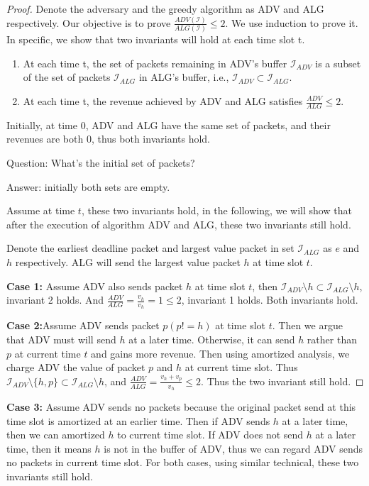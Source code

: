 \documentclass[10 pt,final]{article}
\newcommand{\answer}[1]{{\color{magenta} #1}}
\newcommand{\question}[1]{{\color{blue} #1}}
\begin{document}
\begin{proof} Denote the adversary and the greedy algorithm as ADV and ALG respectively. Our objective is to prove $\frac{ADV(\mathcal{I})}{ALG(\mathcal{I})} \leq 2$. We use induction to prove it. In specific, we show that two invariants will hold at each time slot t.
\begin{enumerate}
\item At each time t, the set of packets remaining in ADV's buffer $\mathcal{I}_{ADV}$ is a subset of the set of packets $\mathcal{I}_{ALG}$ in ALG's buffer, i.e., $\mathcal{I}_{ADV} \subset \mathcal{I}_{ALG}$.
\item At each time t, the revenue achieved by ADV and ALG satisfies $\frac{ADV}{ALG} \leq 2$.
\end{enumerate}



Initially, at time $0$, ADV and ALG have the same set of packets, and their revenues are both $0$, thus both invariants hold. 

\question{ Question: What's the initial set of packets? }

\answer{Answer: initially both sets are empty.}

Assume at time $t$, these two invariants hold, in the following, we will show that after the execution of algorithm ADV and ALG, these two invariants still hold. 

Denote the earliest deadline packet and largest value packet in set $\mathcal{I}_{ALG}$ as $e$ and $h$ respectively. ALG will send the largest value packet $h$ at time slot $t$.

\textbf{Case 1:} Assume ADV also sends packet $h$ at time slot $t$, then $\mathcal{I}_{ADV} \setminus h \subset \mathcal{I}_{ALG} \setminus h$, invariant 2 holds. And $\frac{ADV}{ALG} = \frac{v_h}{v_h} = 1 \leq 2$, invariant 1 holds. Both invariants hold.

\textbf{Case 2:}Assume ADV sends packet $p (p!=h)$ at time slot $t$. Then we argue that ADV must will send $h$ at a later time. Otherwise, it can send $h$ rather than $p$ at current time $t$ and gains more revenue. Then using amortized analysis, we charge ADV the value of packet $p$ and $h$ at current time slot. Thus $\mathcal{I}_{ADV} \setminus \{h,p\} \subset \mathcal{I}_{ALG} \setminus h$, and $\frac{ADV}{ALG} = \frac{v_h+ v_p}{v_h} \leq 2$. Thus the two invariant still hold.
\end{proof}

\textbf{Case 3:} Assume ADV sends no packets because the original packet send at this time slot is amortized at an earlier time. Then if ADV sends $h$ at a later time, then we can amortized $h$ to current time slot. If ADV does not send $h$ at a later time, then it means $h$ is not in the buffer of ADV, thus we can regard ADV sends no packets in current time slot. For both cases, using similar technical, these two invariants still hold.
\end{document}
